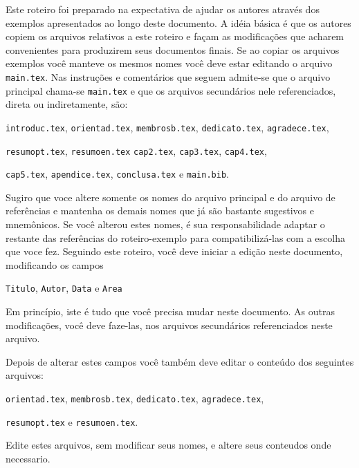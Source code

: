 
Este roteiro foi preparado na expectativa de ajudar os autores através dos
exemplos apresentados ao longo deste documento. A idéia básica é
que os autores copiem os arquivos relativos a este roteiro e façam as
modificações que acharem convenientes para produzirem seus documentos
finais. Se ao copiar os arquivos exemplos você manteve os mesmos nomes
você deve estar editando o arquivo \texttt{main.tex}. Nas
instruções e comentários que seguem admite-se que o arquivo
principal chama-se \texttt{main.tex} e que os arquivos secundários
nele referenciados, direta ou indiretamente, são:

\noindent\texttt{introduc.tex}, \texttt{orientad.tex}, \texttt{membrosb.tex},
\texttt{dedicato.tex}, \texttt{agradece.tex},

\noindent\texttt{resumopt.tex}, \texttt{resumoen.tex}
\texttt{cap2.tex}, \texttt{cap3.tex}, \texttt{cap4.tex},

\noindent\texttt{cap5.tex}, \texttt{apendice.tex},
\texttt{conclusa.tex} e \texttt{main.bib}.

Sugiro que voce altere somente os nomes do arquivo principal e do arquivo de
referências e mantenha os demais nomes que já são bastante
sugestivos e mnemônicos. Se você alterou estes nomes, é sua
responsabilidade adaptar o restante das referências do roteiro-exemplo
para compatibilizá-las com a escolha que voce fez. Seguindo este roteiro,
você deve iniciar a edição neste documento, modificando os campos

\noindent\texttt{Titulo}, \texttt{Autor}, \texttt{Data} e
\texttt{Area}

Em princípio, iste é tudo que você precisa mudar neste documento.
As outras modificações, você deve faze-las, nos arquivos
secundários referenciados neste arquivo.

Depois de alterar estes campos você também deve editar o conteúdo dos seguintes arquivos:

\noindent\texttt{orientad.tex}, \texttt{membrosb.tex}, \texttt{dedicato.tex},
\texttt{agradece.tex},

\noindent\texttt{resumopt.tex} e \texttt{resumoen.tex}.

Edite estes arquivos, sem modificar seus nomes, e altere seus conteudos onde necessario.

